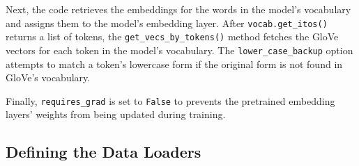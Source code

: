 Next,  the code retrieves the embeddings for the words in the model's vocabulary and assigns them to the model's embedding layer. After \lstinline{vocab.get_itos()} returns a list of tokens, the \lstinline{get_vecs_by_tokens()} method fetches the GloVe vectors for each token in the model's vocabulary. The \lstinline{lower_case_backup} option attempts to match a token's lowercase form if the original form is not found in GloVe's vocabulary.

Finally, \lstinline{requires_grad} is set to \lstinline{False} to prevents the pretrained embedding layers' weights from being updated during training.

\subsection{Defining the Data Loaders}

